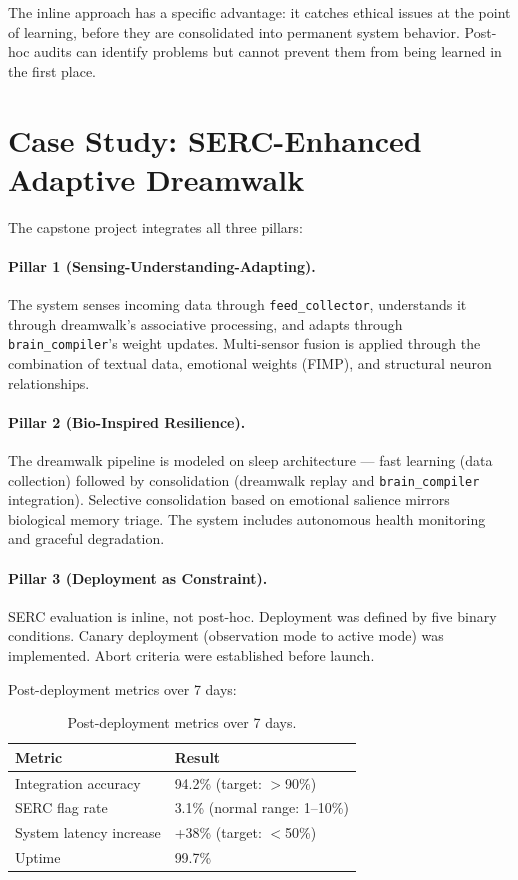 \documentclass[11pt,a4paper]{article}
\begin{document}
The inline approach has a specific advantage: it catches ethical issues at the point of learning, before they are consolidated into permanent system behavior. Post-hoc audits can identify problems but cannot prevent them from being learned in the first place.

\section{Case Study: SERC-Enhanced Adaptive Dreamwalk}

The capstone project integrates all three pillars:

\paragraph{Pillar 1 (Sensing-Understanding-Adapting).} The system senses incoming data through \texttt{feed\_collector}, understands it through dreamwalk's associative processing, and adapts through \texttt{brain\_compiler}'s weight updates. Multi-sensor fusion is applied through the combination of textual data, emotional weights (FIMP), and structural neuron relationships.

\paragraph{Pillar 2 (Bio-Inspired Resilience).} The dreamwalk pipeline is modeled on sleep architecture --- fast learning (data collection) followed by consolidation (dreamwalk replay and \texttt{brain\_compiler} integration). Selective consolidation based on emotional salience mirrors biological memory triage. The system includes autonomous health monitoring and graceful degradation.

\paragraph{Pillar 3 (Deployment as Constraint).} SERC evaluation is inline, not post-hoc. Deployment was defined by five binary conditions. Canary deployment (observation mode to active mode) was implemented. Abort criteria were established before launch.

Post-deployment metrics over 7 days:

\begin{table}[h]
\centering
\begin{tabular}{@{}ll@{}}
\toprule
\textbf{Metric} & \textbf{Result} \\
\midrule
Integration accuracy & 94.2\% (target: $>$90\%) \\
SERC flag rate & 3.1\% (normal range: 1--10\%) \\
System latency increase & +38\% (target: $<$50\%) \\
Uptime & 99.7\% \\
\bottomrule
\end{tabular}
\caption{Post-deployment metrics over 7 days.}
\label{tab:metrics}
\end{table}
\end{document}
